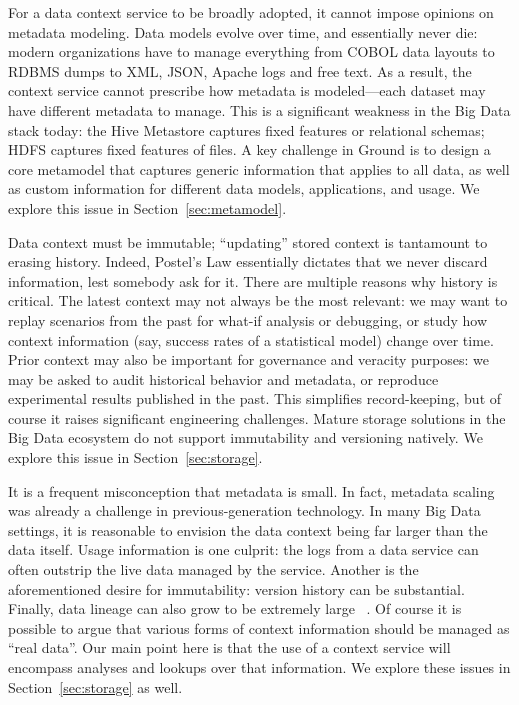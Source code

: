 \documentclass{sig-alternate}
\begin{document}
 For a data context service to be broadly adopted, it cannot impose opinions on metadata modeling. Data models evolve over time, and essentially never die: modern organizations have to manage everything from COBOL data layouts to RDBMS dumps to XML, JSON, Apache logs and free text. As a result, the context service cannot prescribe how metadata is modeled---each dataset may have different metadata to manage. This is a significant weakness in the Big Data stack today: the Hive Metastore captures fixed features or relational schemas; HDFS captures fixed features of files.  A key challenge in Ground is to design a core metamodel that captures generic information that applies to all data, as well as custom information for different data models, applications, and usage. We explore this issue in Section~\ref{sec:metamodel}.

 Data context must be immutable; ``updating'' stored context is tantamount to erasing history. Indeed, Postel's Law essentially dictates that we never discard information, lest somebody ask for it. There are multiple reasons why history is critical. The latest context may not always be the most relevant: we may want to replay scenarios from the past for what-if analysis or debugging, or study how context information (say, success rates of a statistical model) change over time. Prior context may also be important for governance and veracity purposes: we may be asked to audit historical behavior and metadata, or reproduce experimental results published in the past. This simplifies record-keeping, but of course it raises significant engineering challenges.  Mature storage solutions in the Big Data ecosystem do not support immutability and versioning natively.  We explore this issue in Section~\ref{sec:storage}.

 It is a frequent misconception that metadata is small. In fact, metadata scaling was already a challenge in previous-generation technology. In many Big Data settings, it is reasonable to envision the data context being far larger than the data itself. Usage information is one culprit: the logs from a data service can often outstrip the live data managed by the service. Another is the aforementioned desire for immutability: version history can be substantial. Finally, data lineage can also grow to be extremely large
~\cite{cheney2009provenance}.  Of course it is possible to argue that various forms of context information should be managed as ``real data''.  Our main point here is that the use of a context service will encompass analyses and lookups over that information.  We explore these issues in Section~\ref{sec:storage} as well.
\end{document}
